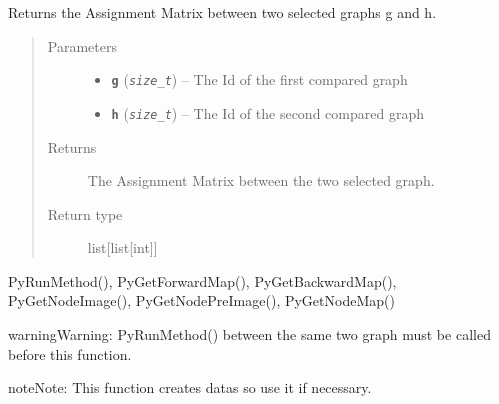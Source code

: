 \documentclass[letterpaper,10pt,english]{sphinxmanual}
\begin{document}
\begin{fulllineitems}
\label{doc:PythonGedLib.PyGetAssignmentMatrix}
Returns the Assignment Matrix between two selected graphs g and h.
\begin{quote}\begin{description}
\item[{Parameters}] \leavevmode\begin{itemize}
\item {} 
\textbf{\texttt{g}} (\emph{\texttt{size\_t}}) -- The Id of the first compared graph

\item {} 
\textbf{\texttt{h}} (\emph{\texttt{size\_t}}) -- The Id of the second compared graph

\end{itemize}

\item[{Returns}] \leavevmode
The Assignment Matrix between the two selected graph.

\item[{Return type}] \leavevmode
list{[}list{[}int{]}{]}

\end{description}\end{quote}




PyRunMethod(), PyGetForwardMap(), PyGetBackwardMap(), PyGetNodeImage(), PyGetNodePreImage(), PyGetNodeMap()



\begin{notice}{warning}{Warning:}
PyRunMethod() between the same two graph must be called before this function.
\end{notice}

\begin{notice}{note}{Note:}
This function creates datas so use it if necessary.
\end{notice}

\end{fulllineitems}

\end{document}
